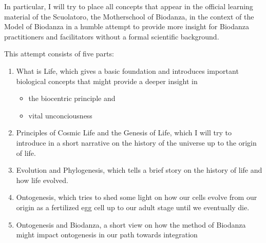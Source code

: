 \documentclass[
]{article}
\providecommand{\tightlist}{%
  \setlength{\itemsep}{0pt}\setlength{\parskip}{0pt}}
\begin{document}
In particular, I will try to place all concepts that appear in the official learning material of the Scuolatoro, the Motherschool of Biodanza, in the context of the Model of Biodanza in a humble attempt to provide more insight for Biodanza practitioners and facilitators without a formal scientific background.

This attempt consists of five parts:

\begin{enumerate}
\def\labelenumi{\arabic{enumi}.}
\item
  What is Life, which gives a basic foundation and introduces important biological concepts that might provide a deeper insight in

  \begin{itemize}
  \tightlist
  \item
    the biocentric principle and
  \item
    vital unconciousness
  \end{itemize}
\item
  Principles of Cosmic Life and the Genesis of Life, which I will try to introduce in a short narrative on the history of the universe up to the origin of life.
\item
  Evolution and Phylogenesis, which tells a brief story on the history of life and how life evolved.
\item
  Ontogenesis, which tries to shed some light on how our cells evolve from our origin as a fertilized egg cell up to our adult stage until we eventually die.
\item
  Ontogenesis and Biodanza, a short view on how the method of Biodanza might impact ontogenesis in our path towards integration
\end{enumerate}
\end{document}

